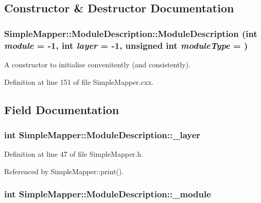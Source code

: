 \subsection{Constructor \& Destructor Documentation}
\hypertarget{struct_simple_mapper_1_1_module_description_a647d050d5ce3bace60cb1f9905b084af}{
\subsubsection[{ModuleDescription}]{\setlength{\rightskip}{0pt plus 5cm}SimpleMapper::ModuleDescription::ModuleDescription (int {\em module} = {\ttfamily -\/1}, \/  int {\em layer} = {\ttfamily -\/1}, \/  unsigned int {\em moduleType} = {})}}
\label{struct_simple_mapper_1_1_module_description_a647d050d5ce3bace60cb1f9905b084af}


A constructor to initialise convenitently (and consistently). 

Definition at line 151 of file SimpleMapper.cxx.

\subsection{Field Documentation}
\hypertarget{struct_simple_mapper_1_1_module_description_a6fce11791e489f397fa62f15bf2034d5}{
\subsubsection[{\_\-layer}]{\setlength{\rightskip}{0pt plus 5cm}int {\bf SimpleMapper::ModuleDescription::\_\-layer}}}
\label{struct_simple_mapper_1_1_module_description_a6fce11791e489f397fa62f15bf2034d5}


Definition at line 47 of file SimpleMapper.h.

Referenced by SimpleMapper::print().\hypertarget{struct_simple_mapper_1_1_module_description_a911114d3bb45d3b400e62889725e2480}{
\subsubsection[{\_\-module}]{\setlength{\rightskip}{0pt plus 5cm}int {\bf SimpleMapper::ModuleDescription::\_\-module}}}
\label{struct_simple_mapper_1_1_module_description_a911114d3bb45d3b400e62889725e2480}


